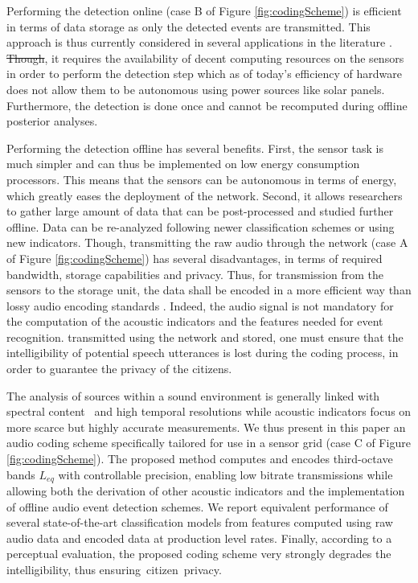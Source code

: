 \documentclass[sensors,article,accept,moreauthors,pdftex,10pt,a4paper]{mdpi}
\providecommand{\DIFaddtex}[1]{{\protect\color{blue}\uwave{#1}}} %
\providecommand{\DIFdeltex}[1]{{\protect\color{red}\sout{#1}}}                      %
\providecommand{\DIFaddbegin}{} %
\providecommand{\DIFaddend}{} %
\providecommand{\DIFdelbegin}{} %
\providecommand{\DIFdelend}{} %
\providecommand{\DIFadd}[1]{\texorpdfstring{\DIFaddtex{#1}}{#1}} %
\providecommand{\DIFdel}[1]{\texorpdfstring{\DIFdeltex{#1}}{}} %
\begin{document}
Performing the detection online (case B of Figure \ref{fig:codingScheme}) is efficient in terms of data storage as only the detected events are transmitted. This approach is thus currently considered in several applications in the literature \cite{defreville2006automatic, mydlarz2017implementation, mydlarz2015design}. \DIFdelbegin \DIFdel{Though}\DIFdelend \DIFaddbegin {\DIFadd{However}}\DIFaddend , it requires the availability of decent computing resources on the sensors in order to perform the detection step which as of today's efficiency of hardware does not allow them to be autonomous using power sources like solar panels. Furthermore, the detection is done once and cannot be recomputed during offline posterior analyses.

Performing the detection offline has several benefits. First, the sensor task is much simpler and can thus be implemented on low energy consumption processors. This means that the sensors can be autonomous in terms of energy, which greatly eases the deployment of the network. Second, it allows researchers to gather large amount of data that can be post-processed and studied further offline. Data can be re-analyzed following newer classification schemes or using new indicators. Though, transmitting the raw audio  through the network (case A of Figure \ref{fig:codingScheme}) has several disadvantages, in terms of required bandwidth, storage capabilities and privacy. Thus, for transmission from the sensors to the storage unit, the data shall be encoded in a more efficient way than lossy audio encoding standards \cite{pan1995tutorial}. Indeed, the audio signal is not mandatory for the computation of the acoustic indicators and the features needed for event recognition. \DIFdelbegin %
\DIFdelend \DIFaddbegin {\DIFadd{In addition, as the data are}} \DIFaddend transmitted using the network and stored, one must ensure that the intelligibility of potential speech utterances is lost during the coding process, in order to guarantee the privacy of the citizens.

The analysis of sources within a sound environment is generally linked with spectral content~\cite{ishiyama2000} and high temporal resolutions while acoustic indicators focus on more scarce but highly accurate measurements. We thus present in this paper an audio coding scheme specifically tailored for use in a sensor grid (case C of Figure \ref{fig:codingScheme}). The proposed method computes and encodes third-octave bands $L_{eq}$ with controllable precision, enabling low bitrate transmissions while allowing both the derivation of other acoustic indicators and the implementation of offline audio event detection schemes. We report equivalent performance of several state-of-the-art classification models from features computed using raw audio data and encoded data at production level rates. Finally, according to a perceptual evaluation, the proposed coding scheme very strongly degrades the intelligibility, thus ensuring\mbox{ citizen privacy.}
\end{document}
